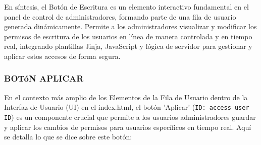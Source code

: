 \documentclass{report}
\begin{document}
En síntesis, el Botón de Escritura es un elemento interactivo fundamental en el panel de control de administradores, formando parte de 
una fila de usuario generada dinámicamente. Permite a los administradores visualizar y modificar los permisos de escritura de los usuarios 
en línea de manera controlada y en tiempo real, integrando plantillas Jinja, JavaScript y lógica de servidor para gestionar y aplicar estos 
accesos de forma segura.

\subsubsection{BOTóN APLICAR}
En el contexto más amplio de los Elementos de la Fila de Usuario dentro de la Interfaz de Usuario (UI) en el index.html, el botón 'Aplicar' 
(\verb|ID: access user ID|) es un componente crucial que permite a los usuarios administradores guardar y aplicar los cambios de permisos 
para usuarios específicos en tiempo real.
Aquí se detalla lo que se dice sobre este botón:
\end{document}
